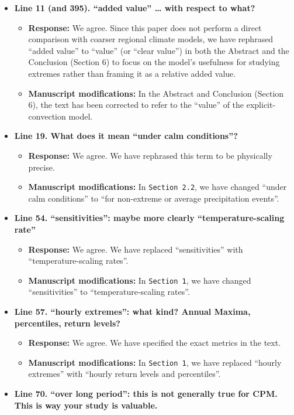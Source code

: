 \documentclass[
  letterpaper,
  DIV=11,
  numbers=noendperiod]{scrartcl}
\providecommand{\tightlist}{%
  \setlength{\itemsep}{0pt}\setlength{\parskip}{0pt}}\usepackage{longtable,booktabs,array}
\begin{document}
\begin{itemize}
\tightlist
\item
  \textbf{Line 11 (and 395). ``added value'' \ldots{} with respect to
  what?}

  \begin{itemize}
  \tightlist
  \item
    \textbf{Response:} We agree. Since this paper does not perform a
    direct comparison with coarser regional climate models, we have
    rephrased ``added value'' to ``value'' (or ``clear value'') in both
    the Abstract and the Conclusion (Section 6) to focus on the model's
    usefulness for studying extremes rather than framing it as a
    relative added value.
  \item
    \textbf{Manuscript modifications:} In the Abstract and Conclusion
    (Section 6), the text has been corrected to refer to the ``value''
    of the explicit-convection model.
  \end{itemize}
\item
  \textbf{Line 19. What does it mean ``under calm conditions''?}

  \begin{itemize}
  \tightlist
  \item
    \textbf{Response:} We agree. We have rephrased this term to be
    physically precise.
  \item
    \textbf{Manuscript modifications:} In \texttt{Section\ 2.2}, we have
    changed ``under calm conditions'' to ``for non-extreme or average
    precipitation events''.
  \end{itemize}
\item
  \textbf{Line 54. ``sensitivities'': maybe more clearly
  ``temperature-scaling rate''}

  \begin{itemize}
  \tightlist
  \item
    \textbf{Response:} We agree. We have replaced ``sensitivities'' with
    ``temperature-scaling rates''.
  \item
    \textbf{Manuscript modifications:} In \texttt{Section\ 1}, we have
    changed ``sensitivities'' to ``temperature-scaling rates''.
  \end{itemize}
\item
  \textbf{Line 57. ``hourly extremes'': what kind? Annual Maxima,
  percentiles, return levels?}

  \begin{itemize}
  \tightlist
  \item
    \textbf{Response:} We agree. We have specified the exact metrics in
    the text.
  \item
    \textbf{Manuscript modifications:} In \texttt{Section\ 1}, we have
    replaced ``hourly extremes'' with ``hourly return levels and
    percentiles''.
  \end{itemize}
\item
  \textbf{Line 70. ``over long period'': this is not generally true for
  CPM. This is way your study is valuable.}


\end{itemize}
\end{document}
